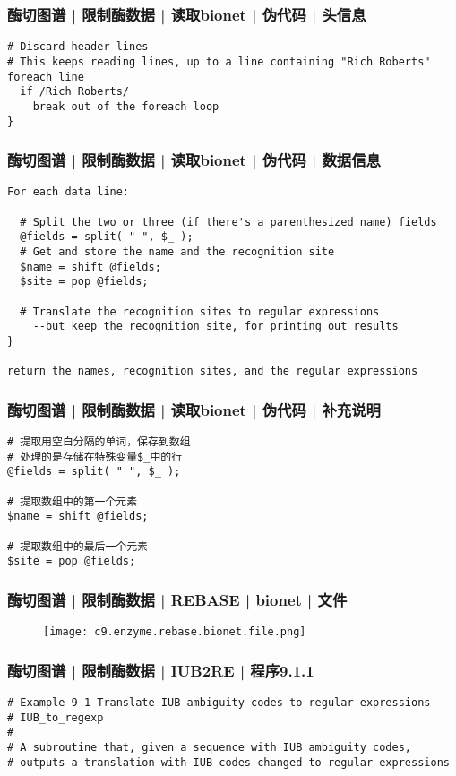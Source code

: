 \begin{frame}[fragile]
  \frametitle{酶切图谱 | 限制酶数据 | 读取bionet | 伪代码 | 头信息}
\begin{lstlisting}
# Discard header lines
# This keeps reading lines, up to a line containing "Rich Roberts"
foreach line 
  if /Rich Roberts/ 
    break out of the foreach loop
}
\end{lstlisting}
\end{frame}


\begin{frame}[fragile]
  \frametitle{酶切图谱 | 限制酶数据 | 读取bionet | 伪代码 | 数据信息}
\begin{lstlisting}[basicstyle=\small\tt]
For each data line:

  # Split the two or three (if there's a parenthesized name) fields
  @fields = split( " ", $_ );
  # Get and store the name and the recognition site
  $name = shift @fields;
  $site = pop @fields;

  # Translate the recognition sites to regular expressions
    --but keep the recognition site, for printing out results
}

return the names, recognition sites, and the regular expressions
\end{lstlisting}
\end{frame}

\begin{frame}[fragile]
  \frametitle{酶切图谱 | 限制酶数据 | 读取bionet | 伪代码 | \alert{补充说明}}
\begin{lstlisting}
# 提取用空白分隔的单词，保存到数组
# 处理的是存储在特殊变量$_中的行
@fields = split( " ", $_ );

# 提取数组中的第一个元素
$name = shift @fields;

# 提取数组中的最后一个元素
$site = pop @fields;
\end{lstlisting}
\end{frame}

\begin{frame}
  \frametitle{酶切图谱 | 限制酶数据 | REBASE | bionet | 文件}
  \begin{figure}
    \centering
    \texttt{[image: c9.enzyme.rebase.bionet.file.png]}
  \end{figure}
\end{frame}

\begin{frame}[fragile]
  \frametitle{酶切图谱 | 限制酶数据 | IUB2RE | 程序9.1.1}
\begin{lstlisting}
# Example 9-1 Translate IUB ambiguity codes to regular expressions
# IUB_to_regexp
#
# A subroutine that, given a sequence with IUB ambiguity codes,
# outputs a translation with IUB codes changed to regular expressions
\end{lstlisting}
\end{frame}


